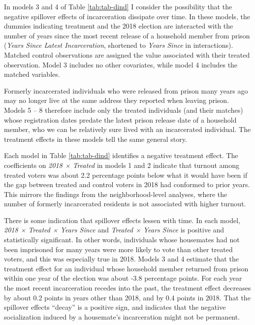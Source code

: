 \documentclass[
  12pt,
]{article}
\begin{document}
In models 3 and 4 of Table \ref{tab:tab-dind} I consider the possibility that the negative spillover effects of incarceration dissipate over time. In these models, the dummies indicating treatment and the 2018 election are interacted with the number of years since the most recent release of a household member from prison (\emph{Years Since Latest Incarceration}, shortened to \emph{Years Since} in interactions). Matched control observations are assigned the value associated with their treated observation. Model 3 includes no other covariates, while model 4 includes the matched variables.

Formerly incarcerated individuals who were released from prison many years ago may no longer live at the same address they reported when leaving prison. Models 5 -- 8 therefore include only the treated individuals (and their matches) whose registration dates predate the latest prison release date of a household member, who we can be relatively sure lived with an incarcerated individual. The treatment effects in these models tell the same general story.

\begin{singlespace}

\end{singlespace}

Each model in Table \ref{tab:tab-dind} identifies a negative treatment effect. The coefficients on \emph{2018 × Treated} in models 1 and 2 indicate that turnout among treated voters was about 2.2 percentage points below what it would have been if the gap between treated and control voters in 2018 had conformed to prior years. This mirrors the findings from the neighborhood-level analyses, where the number of formerly incarcerated residents is not associated with higher turnout.

There is some indication that spillover effects lessen with time. In each model, \emph{2018 × Treated × Years Since} and \emph{Treated × Years Since} is positive and statistically significant. In other words, individuals whose housemates had not been imprisoned for many years were more likely to vote than other treated voters, and this was especially true in 2018. Models 3 and 4 estimate that the treatment effect for an individual whose household member returned from prison within one year of the election was about -3.8 percentage points. For each year the most recent incarceration recedes into the past, the treatment effect decreases by about 0.2 points in years other than 2018, and by 0.4 points in 2018. That the spillover effects ``decay'' is a positive sign, and indicates that the negative socialization induced by a housemate's incarceration might not be permanent.
\end{document}
